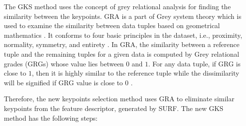 The GKS method uses the concept of grey relational analysis for finding the similarity between the keypoints. GRA \cite{julong1989} is a part of Grey system theory which is used to examine the similarity between data tuples based on geometrical mathematics \cite{sallehuddin2008}. It conforms to four basic principles in the dataset, i.e., proximity, normality, symmetry, and entirety \cite{wang2001}. In GRA, the similarity between a reference tuple and the remaining tuples for a given data is computed by Grey relational grades (GRGs) whose value lies between $0$ and $1$. For any data tuple, if GRG is close to $1$, then it is highly similar to the reference tuple while the dissimilarity will be signified if GRG value is close to $0$ \cite{chang2005}. 

Therefore, the new keypoints selection method uses GRA to eliminate similar keypoints from the feature descriptor, generated by SURF. The new GKS method has the following steps:

